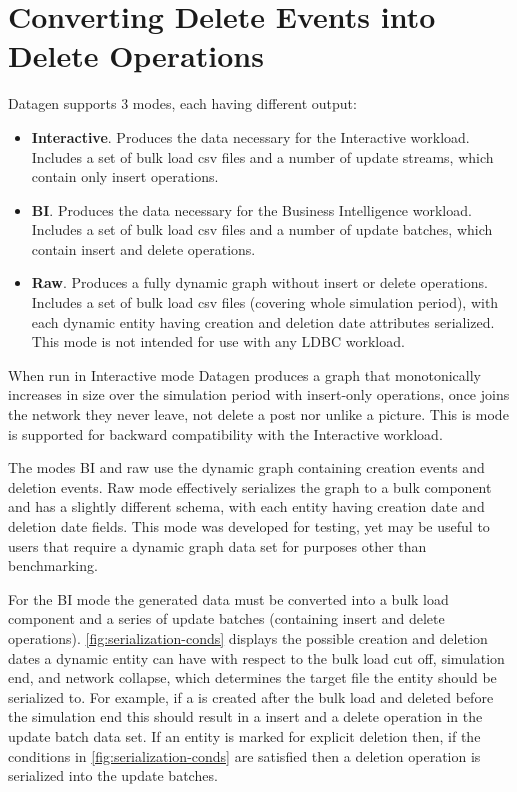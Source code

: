 \section{Converting Delete Events into Delete Operations}
\label{sec:conv-delete-events}
Datagen supports 3 modes, each having different output:
\begin{itemize}
\item \textbf{Interactive}. Produces the data necessary for the Interactive workload. Includes a set of bulk load csv files and a number of update streams, which contain only insert operations.
\item \textbf{BI}. Produces the data necessary for the Business Intelligence workload. Includes a set of bulk load csv files and a number of update batches, which contain insert and delete operations.
\item \textbf{Raw}. Produces a fully dynamic graph without insert or delete operations. Includes a set of bulk load csv files (covering whole simulation period), with each dynamic entity having creation and deletion date attributes serialized. This mode is not intended for use with any LDBC workload.
\end{itemize}

When run in Interactive mode Datagen produces a graph that monotonically increases in size over the simulation period with insert-only operations, \eg once \tPerson joins the network they never leave, not delete a post nor unlike a picture.
This is mode is supported for backward compatibility with the Interactive workload.

The modes BI and raw use the dynamic graph containing creation events and deletion events.
Raw mode effectively serializes the graph to a bulk component and has a slightly different schema, with each entity having creation date and deletion date fields.
This mode was developed for testing, yet may be useful to users that require a dynamic graph data set for purposes other than benchmarking.

For the BI mode the generated data must be converted into a bulk load component and a series of update batches (containing insert and delete operations).
\autoref{fig:serialization-conds} displays the possible creation and deletion dates a dynamic entity can have with respect to the bulk load cut off, simulation end, and network collapse, which determines the target file the entity should be serialized to.
For example, if a \tPost is created after the bulk load and deleted before the simulation end this should result in a insert and a delete operation in the update batch data set.
If an entity is marked for explicit deletion then, if the conditions in \autoref{fig:serialization-conds} are satisfied then a deletion operation is serialized into the update batches.


